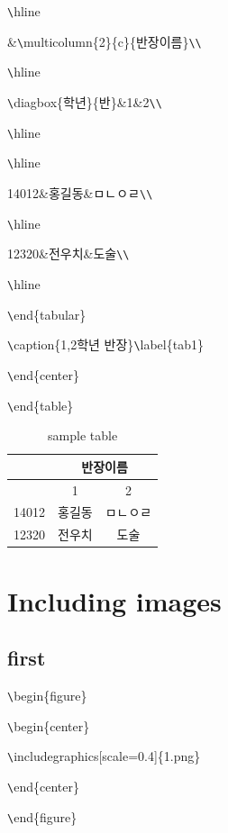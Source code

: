 \documentclass[11pt]{article}
\begin{document}
\verb+\+hline

\&\verb+\+multicolumn\{2\}\{c\textbar\}\{반장이름\}\verb+\+\verb+\+

\verb+\+hline

\verb+\+diagbox\{학년\}\{반\}\&1\&2\verb+\+\verb+\+

\verb+\+hline

\verb+\+hline

14012\&홍길동\&ㅁㄴㅇㄹ\verb+\+\verb+\+

\verb+\+hline

12320\&전우치\&도술\verb+\+\verb+\+

\verb+\+hline

\verb+\+end\{tabular\}

\verb+\+caption\{1,2학년 반장\}\verb+\+label\{tab1\}

\verb+\+end\{center\}

\verb+\+end\{table\}

\begin{table}[!h]
	\begin{center}
	\begin{tabular}{|c|c|c|}
		\hline
		&\multicolumn{2}{c|}{반장이름}\\
		\hline
		\diagbox{학년}{반}&1&2\\
		\hline
		\hline
		14012&홍길동&ㅁㄴㅇㄹ\\
		\hline
		12320&전우치&도술\\
		\hline
	\end{tabular}
	\caption{sample table}\label{tab1}
	\end{center}
\end{table}

\section{Including images}
\subsection{first}

\verb+\+begin\{figure\}

\verb+\+begin\{center\}

\verb+\+includegraphics[scale=0.4]\{1.png\}

\verb+\+end\{center\}

\verb+\+end\{figure\}
\end{document}
